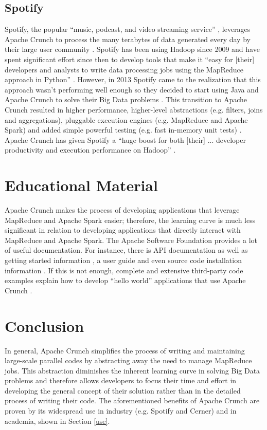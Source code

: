 \documentclass[9pt,twocolumn,twoside]{../../styles/osajnl}
\begin{document}
\subsection{Spotify} \label{spotify}
Spotify, the popular ``music, podcast, and video streaming service''
\cite{www-spotify}, leverages Apache Crunch to process the many
terabytes of data generated every day by their large user community
\cite{www-crunch-spotify}. Spotify has been using Hadoop since 2009
and have spent significant effort since then to develop tools that
make it ``easy for [their] developers and analysts to write data
processing jobs using the MapReduce approach in Python''
\cite{www-crunch-spotify}. However, in 2013 Spotify came to the
realization that this approach wasn't performing well enough so they
decided to start using Java and Apache Crunch to solve their Big Data
problems \cite{www-crunch-spotify}. This transition to Apache Crunch
resulted in higher performance, higher-level abstractions (e.g.
filters, joins and aggregations), pluggable execution engines
(e.g. MapReduce and Apache Spark) and added simple powerful testing
(e.g. fast in-memory unit tests) \cite{www-crunch-spotify}. Apache
Crunch has given Spotify a ``huge boost for both [their] ... developer
productivity and execution performance on Hadoop''
\cite{www-crunch-spotify}.

\section{Educational Material} \label{educational}
Apache Crunch makes the process of developing applications that
leverage MapReduce and Apache Spark easier; therefore, the learning
curve is much less significant in relation to developing applications
that directly interact with MapReduce and Apache Spark. The Apache
Software Foundation provides a lot of useful documentation. For
instance, there is API documentation \cite{www-apache-docs} as well as
getting started information \cite{www-crunch-started}, a user guide
\cite{www-crunch-user-guide} and even source code installation
information \cite{www-crunch-git}. If this is not enough, complete and
extensive third-party code examples explain how to develop ``hello
world'' applications that use Apache Crunch
\cite{www-crunch-tutorial}.

\section{Conclusion} \label{conclusion}
In general, Apache Crunch simplifies the process of writing and
maintaining large-scale parallel codes by abstracting away the need to
manage MapReduce jobs. This abstraction diminishes the inherent
learning curve in solving Big Data problems and therefore allows
developers to focus their time and effort in developing the general
concept of their solution rather than in the detailed process of
writing their code. The aforementioned benefits of Apache Crunch are
proven by its widespread use in industry (e.g. Spotify and Cerner) and
in academia, shown in Section \ref{use}.
\end{document}
